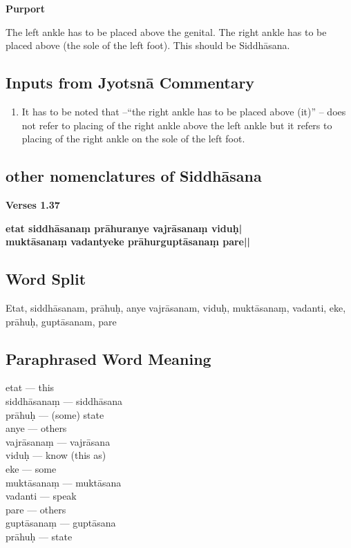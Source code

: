 \textbf{Purport}

The left ankle has to be placed above the genital. The right ankle has to be placed above (the sole of the left foot). This should be Siddhāsana.

\subsection*{Inputs from Jyotsnā Commentary}


\begin{enumerate}
\item It has to be noted that –“the right ankle has to be placed above (it)” – does not refer to placing of the right ankle above the left ankle but it refers to placing of the right ankle on the sole of the left foot. 
\end{enumerate}

\subsection*{other nomenclatures of Siddhāsana}

\noindent \textbf{Verses 1.37}

\begin{shloka}
\textbf{etat siddhāsanaṃ prāhuranye vajrāsanaṃ viduḥ|}\\
\textbf{muktāsanaṃ vadantyeke prāhurguptāsanaṃ pare||}
\end{shloka}
\vspace{-10pt}

\subsection*{Word Split}
\vspace{-10pt}

Etat, siddhāsanam, prāhuḥ, anye vajrāsanam, viduḥ, muktāsanaṃ, vadanti, eke, prāhuḥ, guptāsanam, pare
\vspace{-10pt}

\subsection*{Paraphrased Word Meaning}
\vspace{-10pt}

\begin{multicols}{2}
\itemsep=0pt
etat --- this   \\
siddhāsanaṃ --- siddhāsana   \\
prāhuḥ --- (some) state \\
anye --- others   \\
vajrāsanaṃ --- vajrāsana  \\
viduḥ --- know (this as) \\
eke --- some \\
muktāsanaṃ --- muktāsana   \\
vadanti --- speak \\
pare --- others \\
guptāsanaṃ ---  guptāsana  \\
prāhuḥ --- state  
\end{multicols}
\vspace{-10pt}

